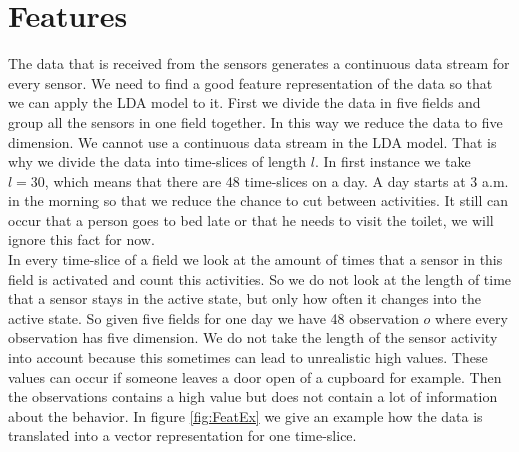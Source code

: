 \documentclass[11pt,a4paper]{article}
\begin{document}
\section{Features}
\label{sec:features}
The data that is received from the sensors generates a continuous data stream for every sensor. We need to find a good feature representation of the data so that we can apply the LDA model to it.
First we divide the data in five fields and group all the sensors in one field together. In this way we reduce the data to five dimension. We cannot use a continuous data stream in the LDA model. That is why we divide the data into time-slices of length $l$. In first instance we take $l=30$, which means that there are 48 time-slices on a day. A day starts at 3 a.m. in the morning so that we reduce the chance to cut between activities. It still can occur that a person goes to bed late or that he needs to visit the toilet, we will ignore this fact for now.\\
In every time-slice of a field we look at the amount of times that a sensor in this field is activated and count this activities. So we do not look at the length of time that a sensor stays in the active state, but only how often it changes into the active state. So given five fields for one day we have 48 observation $o$ where every observation has five dimension. We do not take the length of the sensor activity into account because this sometimes can lead to unrealistic high values. These values can occur if someone leaves a door open of a cupboard for example. Then the observations contains a high value but does not contain a lot of information about the behavior. In figure \ref{fig:FeatEx} we give an example how the data is translated into a vector representation for one time-slice.%
\end{document}
